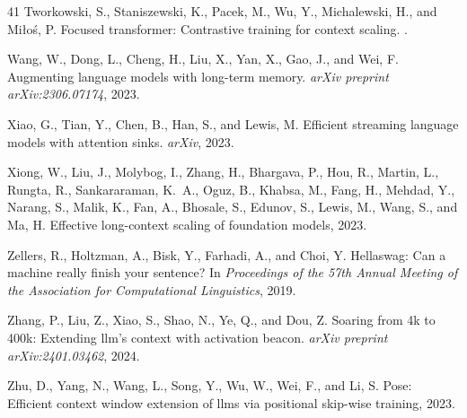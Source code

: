 \documentclass{article}
\theoremstyle{plain}
\theoremstyle{definition}
\theoremstyle{remark}
\begin{document}
\begin{thebibliography}{41}
Tworkowski, S., Staniszewski, K., Pacek, M., Wu, Y., Michalewski, H., and
  Miłoś, P.
\newblock Focused transformer: Contrastive training for context scaling.
.

Wang, W., Dong, L., Cheng, H., Liu, X., Yan, X., Gao, J., and Wei, F.
\newblock Augmenting language models with long-term memory.
\newblock \emph{arXiv preprint arXiv:2306.07174}, 2023.

Xiao, G., Tian, Y., Chen, B., Han, S., and Lewis, M.
\newblock Efficient streaming language models with attention sinks.
\newblock \emph{arXiv}, 2023.

Xiong, W., Liu, J., Molybog, I., Zhang, H., Bhargava, P., Hou, R., Martin, L.,
  Rungta, R., Sankararaman, K.~A., Oguz, B., Khabsa, M., Fang, H., Mehdad, Y.,
  Narang, S., Malik, K., Fan, A., Bhosale, S., Edunov, S., Lewis, M., Wang, S.,
  and Ma, H.
\newblock Effective long-context scaling of foundation models, 2023.

Zellers, R., Holtzman, A., Bisk, Y., Farhadi, A., and Choi, Y.
\newblock Hellaswag: Can a machine really finish your sentence?
\newblock In \emph{Proceedings of the 57th Annual Meeting of the Association
  for Computational Linguistics}, 2019.

Zhang, P., Liu, Z., Xiao, S., Shao, N., Ye, Q., and Dou, Z.
\newblock Soaring from 4k to 400k: Extending llm's context with activation
  beacon.
\newblock \emph{arXiv preprint arXiv:2401.03462}, 2024.

Zhu, D., Yang, N., Wang, L., Song, Y., Wu, W., Wei, F., and Li, S.
\newblock Pose: Efficient context window extension of llms via positional
  skip-wise training, 2023.

\end{thebibliography}
\end{document}
